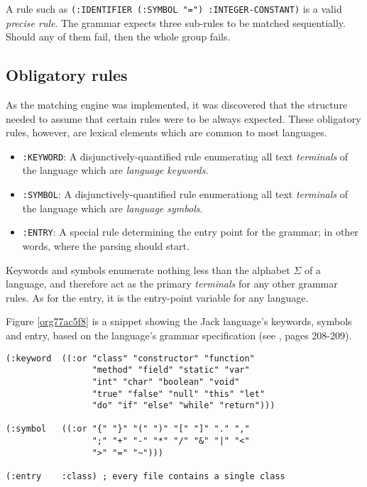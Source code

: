 \documentclass[a4paper,11pt,oneside]{article}
\begin{document}
A rule such as \texttt{(:IDENTIFIER (:SYMBOL "=") :INTEGER-CONSTANT)} is a
valid \emph{precise rule}. The grammar expects three sub-rules to be matched
sequentially. Should any of them fail, then the whole group fails.

\subsection*{Obligatory rules}
\label{sec:org14821c2}

As the matching engine was implemented, it was discovered that the
structure needed to assume that certain rules were to be
always expected. These obligatory rules, however, are lexical elements
which are common to most languages.

\begin{itemize}
\item \texttt{:KEYWORD}: A disjunctively-quantified rule enumerating all text
\emph{terminals} of the language which are \emph{language keywords}.
\item \texttt{:SYMBOL}: A disjunctively-quantified rule enumerationg all text
\emph{terminals} of the language which are \emph{language symbols}.
\item \texttt{:ENTRY}: A special rule determining the entry point for the grammar;
in other words, where the parsing should start.
\end{itemize}

Keywords and symbols enumerate nothing less than the alphabet \(\Sigma\)
of a language, and therefore act as the primary \emph{terminals} for any
other grammar rules. As for the entry, it is the entry-point variable
for any language.

Figure \ref{org77ac5f8} is a snippet showing the Jack language's
keywords, symbols and entry, based on the language's grammar
specification (see \cite{nand2tetris}, pages 208-209).

\begin{verbatim}
(:keyword  ((:or "class" "constructor" "function"
                 "method" "field" "static" "var"
                 "int" "char" "boolean" "void"
                 "true" "false" "null" "this" "let"
                 "do" "if" "else" "while" "return")))

(:symbol   ((:or "{" "}" "(" ")" "[" "]" "." ","
                 ";" "+" "-" "*" "/" "&" "|" "<"
                 ">" "=" "~")))

(:entry    :class) ; every file contains a single class
\end{verbatim}
\end{document}
